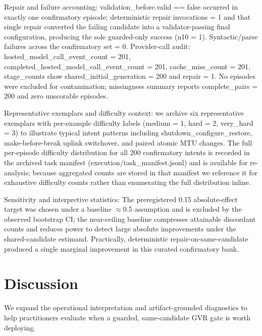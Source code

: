 \documentclass[conference]{IEEEtran}
\begin{document}
Repair and failure accounting: validation\_before.valid == false occurred in exactly one confirmatory episode; deterministic repair invocations = 1 and that single repair converted the failing candidate into a validator-passing final configuration, producing the sole guarded-only success (n10 = 1). Syntactic/parse failures across the confirmatory set = 0. Provider-call audit: hosted\_model\_call\_event\_count = 201, completed\_hosted\_model\_call\_event\_count = 201, cache\_miss\_count = 201, stage\_counts show shared\_initial\_generation = 200 and repair = 1. No episodes were excluded for contamination; missingness summary reports complete\_pairs = 200 and zero unscorable episodes.

Representative exemplars and difficulty context: we archive six representative exemplars with per-example difficulty labels (medium = 1, hard = 2, very\_hard = 3) to illustrate typical intent patterns including shutdown\_configure\_restore, make-before-break uplink switchover, and paired atomic MTU changes. The full per-episode difficulty distribution for all 200 confirmatory intents is recorded in the archived task manifest (execution/task\_manifest.jsonl) and is available for re-analysis; because aggregated counts are stored in that manifest we reference it for exhaustive difficulty counts rather than enumerating the full distribution inline.

Sensitivity and interpretive statistics: The preregistered 0.15 absolute-effect target was chosen under a baseline \ensuremath{\approx}0.5 assumption and is excluded by the observed bootstrap CI; the near-ceiling baseline compresses attainable discordant counts and reduces power to detect large absolute improvements under the shared-candidate estimand. Practically, deterministic repair-on-same-candidate produced a single marginal improvement in this curated confirmatory bank.

\section{Discussion}
We expand the operational interpretation and artifact-grounded diagnostics to help practitioners evaluate when a guarded, same-candidate GVR gate is worth deploying.
\end{document}
